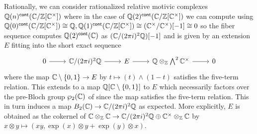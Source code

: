 Rationally, we can consider rationalized relative motivic complexes $\mathbb{Q}(n)^{\mathsf{cont}}(\mathbb{C}/\mathbb{Z}[\mathbb{C}^{\times}])$ where in the case of $\mathbb{Q}(2)^{\mathsf{cont}}(\mathbb{C}/\mathbb{Z}[\mathbb{C}^{\times}])$ we can compute using $\mathbb{Q}(0)^{\mathsf{cont}}(\mathbb{C}/\mathbb{Z}[\mathbb{C}^{\times}])\cong\mathbb{Q}, \mathbb{Q}(1)^{\mathsf{cont}}(\mathbb{C}/\mathbb{Z}[\mathbb{C}^{\times}])\cong(\mathbb{C}^{\times}/\mathbb{C}^{\times})[-1]\cong0$ so the fiber sequence computes $\mathbb{Q}(2)^{\mathsf{cont}}(\mathbb{C})$ as $(\mathbb{C}/(2\pi i)^{2}\mathbb{Q})[-1]$ and is given by an extension $E$ fitting into the short exact sequence 
$$%
\begin{tikzcd}
	0 & {\CC/(2\pi i)^{2}\QQ} & E & {\QQ\otimes_{\ZZ}\bigwedge^{2}\CC^{\times}} & 0
	\arrow[from=1-1, to=1-2]
	\arrow[from=1-2, to=1-3]
	\arrow[from=1-3, to=1-4]
	\arrow[from=1-4, to=1-5]
\end{tikzcd}$$
where the map $\mathbb{C}\setminus\{0,1\}\to E$ by $t\mapsto (t)\wedge(1-t)$ satisfies the five-term relation. This extends to a map $\mathbb{Q}[\mathbb{C}\setminus\{0,1\}]$ to $E$ which necessarily factors over the pre-Bloch group $\wp_{2}(\mathbb{C})$ of  since the map satisfies the five-term relation. This in turn induces a map $B_{2}(\mathbb{C})\to \mathbb{C}/(2\pi i)^{2}\mathbb{Q}$ as expected. More explicitly, $E$ is obtained as the cokernel of $\mathbb{C}\otimes_{\mathbb{Z}}\mathbb{C}\to \mathbb{C}/(2\pi i)^{2}\mathbb{Q}\oplus\mathbb{C}^{\times}\otimes_{\mathbb{Z}}\mathbb{C}$ by $x\otimes y\mapsto (xy, \exp(x)\otimes y+\exp(y)\otimes x)$. 